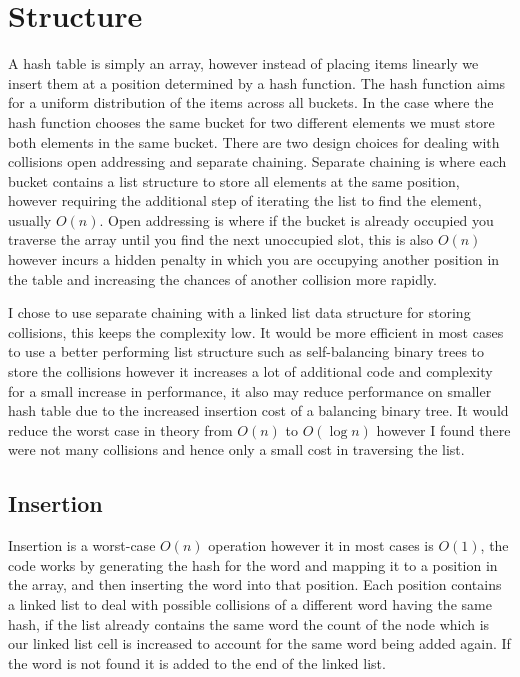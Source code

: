 \documentclass[12pt]{article}
\begin{document}
\section{Structure}
A hash table is simply an array, however instead of placing items linearly we insert them at a position determined by a hash function. The hash function aims for a uniform distribution of the items across all buckets. In the case where the hash function chooses the same bucket for two different elements we must store both elements in the same bucket. There are two design choices for dealing with collisions open addressing and separate chaining. Separate chaining is where each bucket contains a list structure to store all elements at the same position, however requiring the additional step of iterating the list to find the element, usually $O(n)$. Open addressing is where if the bucket is already occupied you traverse the array until you find the next unoccupied slot, this is also $O(n)$ however incurs a hidden penalty in which you are occupying another position in the table and increasing the chances of another collision more rapidly.

I chose to use separate chaining with a linked list data structure for storing collisions, this keeps the complexity low. It would be more efficient in most cases to use a better performing list structure such as self-balancing binary trees to store the collisions however it increases a lot of additional code and complexity for a small increase in performance, it also may reduce performance on smaller hash table due to the increased insertion cost of a balancing binary tree. It would reduce the worst case in theory from $O(n)$ to $O(\log{}n)$ however I found there were not many collisions and hence only a small cost in traversing the list.

\subsection{Insertion}
Insertion is a worst-case $O(n)$ operation however it in most cases is $O(1)$, the code works by generating the hash for the word and mapping it to a position in the array, and then inserting the word into that position. Each position contains a linked list to deal with possible collisions of a different word having the same hash, if the list already contains the same word the count of the node which is our linked list cell is increased to account for the same word being added again. If the word is not found it is added to the end of the linked list.
\end{document}
